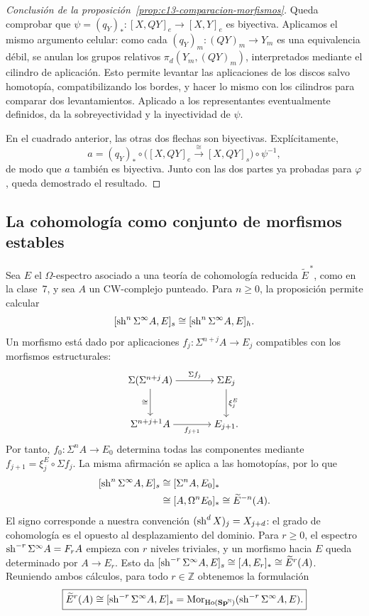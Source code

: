 \begin{proof}[Conclusión de la proposición~\ref{prop:c13-comparacion-morfismos}]
Queda comprobar que $\psi=(q_Y)_*\colon[X,QY]_e\to[X,Y]_e$ es biyectiva. Aplicamos el mismo argumento celular: como cada $(q_Y)_m\colon(QY)_m\to Y_m$ es una equivalencia débil, se anulan los grupos relativos $\pi_d(Y_m,(QY)_m)$, interpretados mediante el cilindro de aplicación. Esto permite levantar las aplicaciones de los discos salvo homotopía, compatibilizando los bordes, y hacer lo mismo con los cilindros para comparar dos levantamientos. Aplicado a los representantes eventualmente definidos, da la sobreyectividad y la inyectividad de $\psi$.

En el cuadrado anterior, las otras dos flechas son biyectivas. Explícitamente,
\[
a=(q_Y)_*\circ\bigl([X,QY]_e\xrightarrow{\cong}[X,QY]_s\bigr)\circ\psi^{-1},
\]
de modo que $a$ también es biyectiva. Junto con las dos partes ya probadas para $\varphi$, queda demostrado el resultado.
\end{proof}

\subsection{La cohomología como conjunto de morfismos estables}\label{subsec:c13-cohomologia}

Sea $E$ el $\Omega$-espectro asociado a una teoría de cohomología reducida $\widetilde E^{\,*}$, como en la clase~7, y sea $A$ un CW-complejo punteado. Para $n\ge0$, la proposición permite calcular
\[
[\operatorname{sh}^n\Sigma^\infty A,E]_s\cong[\operatorname{sh}^n\Sigma^\infty A,E]_h.
\]
Un morfismo está dado por aplicaciones $f_j\colon\Sigma^{n+j}A\to E_j$ compatibles con los morfismos estructurales:
\[
\begin{tikzcd}[cramped,column sep=large,row sep=large]
\Sigma(\Sigma^{n+j}A) \arrow[r,"\Sigma f_j"] \arrow[d,"\cong"']
& \Sigma E_j \arrow[d,"\xi^E_j"]\\
\Sigma^{n+j+1}A \arrow[r,"f_{j+1}"'] & E_{j+1}.
\end{tikzcd}
\]
Por tanto, $f_0\colon\Sigma^nA\to E_0$ determina todas las componentes mediante $f_{j+1}=\xi^E_j\circ\Sigma f_j$. La misma afirmación se aplica a las homotopías, por lo que
\[
\begin{aligned}
[\sh^n\Sigma^\infty A,E]_s
&\cong[\Sigma^nA,E_0]_*\\
&\cong[A,\Omega^nE_0]_*\cong\widetilde E^{-n}(A).
\end{aligned}
\]
El signo corresponde a nuestra convención $(\operatorname{sh}^dX)_j=X_{j+d}$: el grado de cohomología es el opuesto al desplazamiento del dominio. Para $r\ge0$, el espectro $\operatorname{sh}^{-r}\Sigma^\infty A=F_rA$ empieza con $r$ niveles triviales, y un morfismo hacia $E$ queda determinado por $A\to E_r$. Esto da $[\operatorname{sh}^{-r}\Sigma^\infty A,E]_s\cong[A,E_r]_*\cong\widetilde E^r(A)$. Reuniendo ambos cálculos, para todo $r\in\mathbb Z$ obtenemos la formulación
\[
\boxed{\widetilde E^r(A)\cong[\operatorname{sh}^{-r}\Sigma^\infty A,E]_s
=\operatorname{Mor}_{\operatorname{Ho}(\mathbf{Sp}^{\mathbb N})}(\operatorname{sh}^{-r}\Sigma^\infty A,E).}
\]

